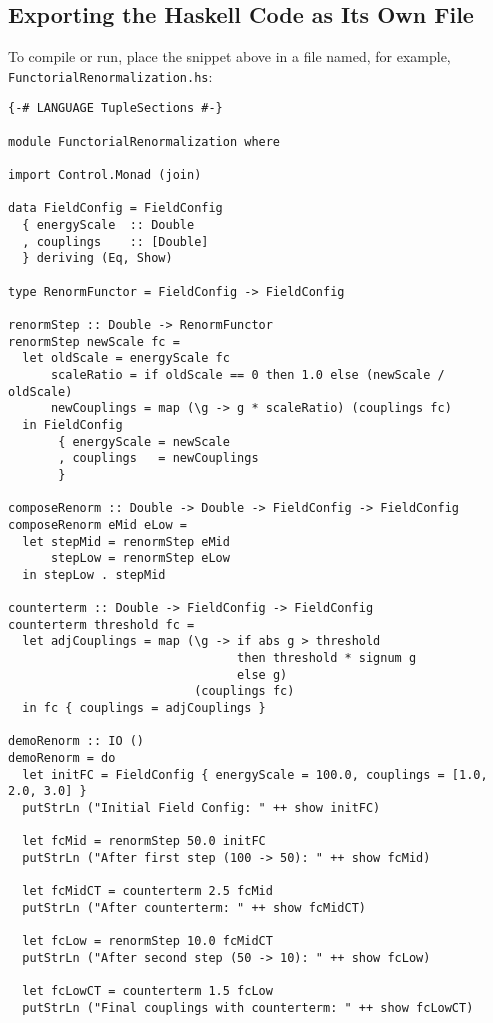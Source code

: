 \documentclass[12pt]{article}
\begin{document}
\vspace{1em}

\subsection{Exporting the Haskell Code as Its Own File}

To compile or run, place the snippet above in a file named, for example, 
\texttt{FunctorialRenormalization.hs}:

\begin{verbatim}
{-# LANGUAGE TupleSections #-}

module FunctorialRenormalization where

import Control.Monad (join)

data FieldConfig = FieldConfig
  { energyScale  :: Double
  , couplings    :: [Double]
  } deriving (Eq, Show)

type RenormFunctor = FieldConfig -> FieldConfig

renormStep :: Double -> RenormFunctor
renormStep newScale fc =
  let oldScale = energyScale fc
      scaleRatio = if oldScale == 0 then 1.0 else (newScale / oldScale)
      newCouplings = map (\g -> g * scaleRatio) (couplings fc)
  in FieldConfig
       { energyScale = newScale
       , couplings   = newCouplings
       }

composeRenorm :: Double -> Double -> FieldConfig -> FieldConfig
composeRenorm eMid eLow =
  let stepMid = renormStep eMid
      stepLow = renormStep eLow
  in stepLow . stepMid

counterterm :: Double -> FieldConfig -> FieldConfig
counterterm threshold fc =
  let adjCouplings = map (\g -> if abs g > threshold
                                then threshold * signum g
                                else g)
                          (couplings fc)
  in fc { couplings = adjCouplings }

demoRenorm :: IO ()
demoRenorm = do
  let initFC = FieldConfig { energyScale = 100.0, couplings = [1.0, 2.0, 3.0] }
  putStrLn ("Initial Field Config: " ++ show initFC)

  let fcMid = renormStep 50.0 initFC
  putStrLn ("After first step (100 -> 50): " ++ show fcMid)

  let fcMidCT = counterterm 2.5 fcMid
  putStrLn ("After counterterm: " ++ show fcMidCT)

  let fcLow = renormStep 10.0 fcMidCT
  putStrLn ("After second step (50 -> 10): " ++ show fcLow)

  let fcLowCT = counterterm 1.5 fcLow
  putStrLn ("Final couplings with counterterm: " ++ show fcLowCT)
\end{verbatim}
\end{document}

